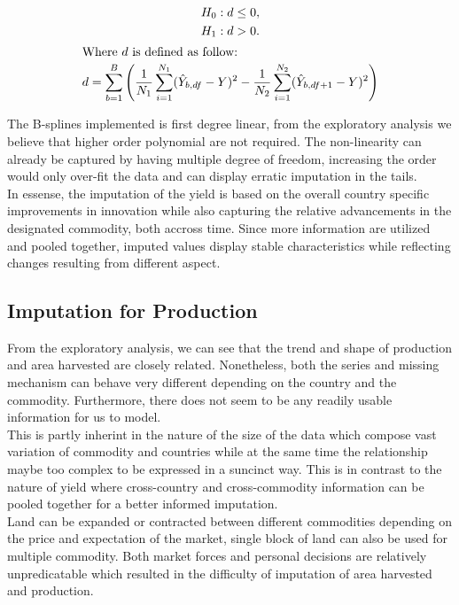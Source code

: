 \documentclass[nojss]{jss}\usepackage[]{graphicx}\usepackage[]{color}
\begin{document}
\begin{gather*}
  H_0 : d\le0 ,\\
  H_1 : d>0 .\\
  \intertext{Where $d$ is defined as follow:}
  d = \sum_{b=1}^B\left(
  \frac{1}{N_1}\sum_{i=1}^{N_1}(\hat{Y}_{b, df} - Y)^2 - 
  \frac{1}{N_2}\sum_{i=1}^{N_2}(\hat{Y}_{b, df + 1} - Y)^2\right)
\end{gather*}

The B-splines implemented is first degree linear, from the exploratory
analysis we believe that higher order polynomial are not required. The
non-linearity can already be captured by having multiple degree of
freedom, increasing the order would only over-fit the data and can
display erratic imputation in the tails.\\


In essense, the imputation of the yield is based on the overall
country specific improvements in innovation while also capturing the
relative advancements in the designated commodity, both accross
time. Since more information are utilized and pooled together, imputed
values display stable characteristics while reflecting changes
resulting from different aspect.\\



\FloatBarrier
\subsection{Imputation for Production}

From the exploratory analysis, we can see that the trend and shape of
production and area harvested are closely related. Nonetheless, both
the series and missing mechanism can behave very different depending
on the country and the commodity. Furthermore, there does not seem to
be any readily usable information for us to model.\\


This is partly inherint in the nature of the size of the data which
compose vast variation of commodity and countries while at the same
time the relationship maybe too complex to be expressed in a suncinct
way. This is in contrast to the nature of yield where cross-country
and cross-commodity information can be pooled together for a better
informed imputation.\\

Land can be expanded or contracted between different commodities
depending on the price and expectation of the market, single block of
land can also be used for multiple commodity. Both market forces and
personal decisions are relatively unpredicatable which resulted in the
difficulty of imputation of area harvested and production.\\
\end{document}
